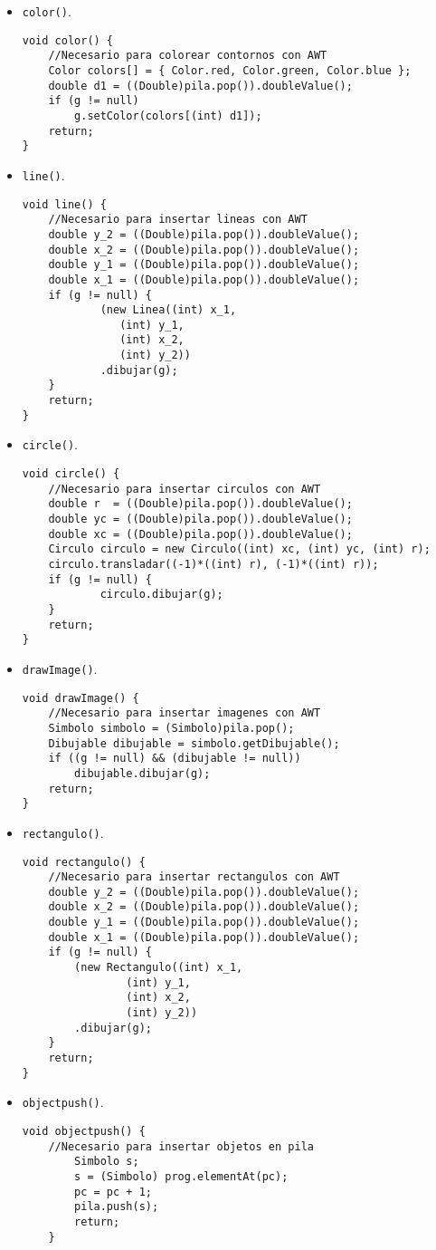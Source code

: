 \begin{itemize}
\item \texttt{color()}.
\begin{lstlisting}
void color() {
	//Necesario para colorear contornos con AWT
   	Color colors[] = { Color.red, Color.green, Color.blue };
  	double d1 = ((Double)pila.pop()).doubleValue();
  	if (g != null) 
		g.setColor(colors[(int) d1]);
	return;
}
\end{lstlisting}


\item \texttt{line()}.
\begin{lstlisting}
void line() {
	//Necesario para insertar lineas con AWT
	double y_2 = ((Double)pila.pop()).doubleValue();
	double x_2 = ((Double)pila.pop()).doubleValue();
	double y_1 = ((Double)pila.pop()).doubleValue();
	double x_1 = ((Double)pila.pop()).doubleValue();
  	if (g != null) {
       		(new Linea((int) x_1, 
			   (int) y_1,
		  	   (int) x_2, 
		  	   (int) y_2))
			.dibujar(g);
	}
	return;
}
\end{lstlisting}

\item \texttt{circle()}.
\begin{lstlisting}
void circle() {
	//Necesario para insertar circulos con AWT
	double r  = ((Double)pila.pop()).doubleValue();
	double yc = ((Double)pila.pop()).doubleValue();
	double xc = ((Double)pila.pop()).doubleValue();
	Circulo circulo = new Circulo((int) xc, (int) yc, (int) r);
	circulo.transladar((-1)*((int) r), (-1)*((int) r));
  	if (g != null) {
       		circulo.dibujar(g);
	}
	return;
}
\end{lstlisting}

\item \texttt{drawImage()}.
\begin{lstlisting}
void drawImage() {
	//Necesario para insertar imagenes con AWT
	Simbolo simbolo = (Simbolo)pila.pop();
	Dibujable dibujable = simbolo.getDibujable();
	if ((g != null) && (dibujable != null))
		dibujable.dibujar(g);
	return;
}
\end{lstlisting}

\item \texttt{rectangulo()}.
\begin{lstlisting}
void rectangulo() {
	//Necesario para insertar rectangulos con AWT
	double y_2 = ((Double)pila.pop()).doubleValue();
	double x_2 = ((Double)pila.pop()).doubleValue();
	double y_1 = ((Double)pila.pop()).doubleValue();
	double x_1 = ((Double)pila.pop()).doubleValue();
  	if (g != null) {
     	(new Rectangulo((int) x_1, 
			   	(int) y_1,
		  	   	(int) x_2, 
	  		   	(int) y_2))
		.dibujar(g);
	}
	return;
}
\end{lstlisting}

\item \texttt{objectpush()}.
\begin{lstlisting}
void objectpush() { 
	//Necesario para insertar objetos en pila
		Simbolo s;
	  	s = (Simbolo) prog.elementAt(pc);
	  	pc = pc + 1;
	  	pila.push(s);
		return;
	}
\end{lstlisting}

\end{itemize}